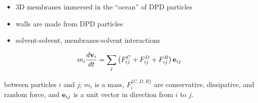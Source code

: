 \begin{itemize}
  \item 3D membranes immersed in the ``ocean'' of DPD particles
  \item walls are made from DPD particles
  \item solvent-solvent, membranes-solvent interactions
\end{itemize}

\[
  m_i \frac{d \mathbf{v}_i}{dt} = \sum_{j}
  \left(
    F_{ij}^{C} + F_{ij}^{D} + F_{ij}^{R}
  \right) \mathbf{e}_{ij}{}
\]

between particles $i$ and $j$; $m_i$ is a mass, $F_{i}^{\{C,D,R\}}$
are conservative, dissipative, and random force, and $\mathbf{e}_{ij}{}$ is a unit
vector in direction from $i$ to $j$.
\eframe
